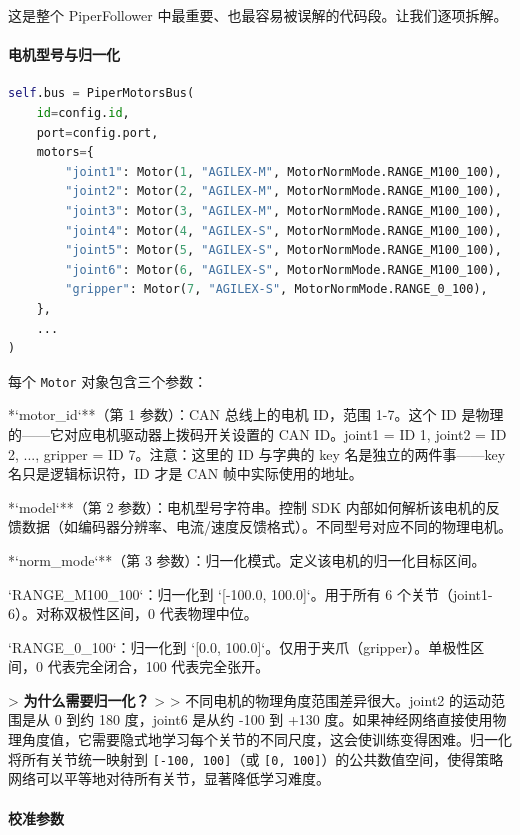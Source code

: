 \documentclass[UTF8,a4paper,11pt]{ctexart}
\begin{document}
{这是整个 PiperFollower 中最重要、也最容易被误解的代码段。让我们逐项拆解。

\paragraph{电机型号与归一化}


\begin{lstlisting}[language=python]
self.bus = PiperMotorsBus(
    id=config.id,
    port=config.port,
    motors={
        "joint1": Motor(1, "AGILEX-M", MotorNormMode.RANGE_M100_100),
        "joint2": Motor(2, "AGILEX-M", MotorNormMode.RANGE_M100_100),
        "joint3": Motor(3, "AGILEX-M", MotorNormMode.RANGE_M100_100),
        "joint4": Motor(4, "AGILEX-S", MotorNormMode.RANGE_M100_100),
        "joint5": Motor(5, "AGILEX-S", MotorNormMode.RANGE_M100_100),
        "joint6": Motor(6, "AGILEX-S", MotorNormMode.RANGE_M100_100),
        "gripper": Motor(7, "AGILEX-S", MotorNormMode.RANGE_0_100),
    },
    ...
)
\end{lstlisting}

每个 \texttt{Motor} 对象包含三个参数：

\item **`motor_id`**（第 1 参数）：CAN 总线上的电机 ID，范围 1-7。这个 ID 是物理的——它对应电机驱动器上拨码开关设置的 CAN ID。joint1 = ID 1, joint2 = ID 2, ..., gripper = ID 7。注意：这里的 ID 与字典的 key 名是独立的两件事——key 名只是逻辑标识符，ID 才是 CAN 帧中实际使用的地址。
\item **`model`**（第 2 参数）：电机型号字符串。控制 SDK 内部如何解析该电机的反馈数据（如编码器分辨率、电流/速度反馈格式）。不同型号对应不同的物理电机。
\item **`norm_mode`**（第 3 参数）：归一化模式。定义该电机的归一化目标区间。
\item `RANGE_M100_100`：归一化到 `[-100.0, 100.0]`。用于所有 6 个关节（joint1-6）。对称双极性区间，0 代表物理中位。
\item `RANGE_0_100`：归一化到 `[0.0, 100.0]`。仅用于夹爪（gripper）。单极性区间，0 代表完全闭合，100 代表完全张开。

> \textbf{为什么需要归一化？}
>
> 不同电机的物理角度范围差异很大。joint2 的运动范围是从 0 到约 180 度，joint6 是从约 -100 到 +130 度。如果神经网络直接使用物理角度值，它需要隐式地学习每个关节的不同尺度，这会使训练变得困难。归一化将所有关节统一映射到 \texttt{[-100, 100]}（或 \texttt{[0, 100]}）的公共数值空间，使得策略网络可以平等地对待所有关节，显著降低学习难度。

\paragraph{校准参数}


}
\end{document}
